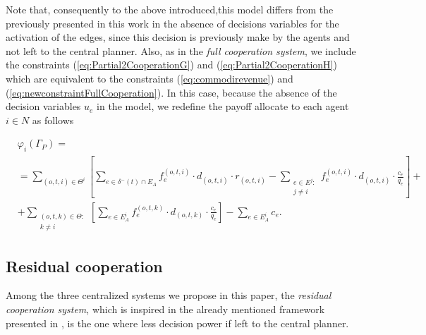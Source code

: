 \documentclass[review]{elsarticle}
\begin{document}
Note that, consequently to the above introduced,this model differs from the previously presented in this work in the absence of decisions variables for the activation of the edges, since this decision is previously make by the agents and not left to the central planner. Also, as in the \emph{full cooperation system}, we include the constraints (\ref{eq:Partial2CooperationG}) and (\ref{eq:Partial2CooperationH})
which are equivalent to the constraints (\ref{eq:commodirevenue}) and (\ref{eq:newconstraintFullCooperation}). In this case, because the absence of the decision variables $u_e$ in the model, we redefine the payoff allocate to each agent $i\in N$ as follows

\begin{equation}
    \begin{split}
    & \varphi_i(\Gamma_P) =\label{eq:PartialCooperationPayoff} \\
    & = \sum_{(o,t,i)\in \Theta^i} \left[ \sum_{e \in \delta^-(t)\cap E_A} f_e^{(o,t,i)} \cdot d_{(o,t,i)} \cdot r_{(o,t,i)} -  \sum_{\substack{e\in E^j \colon\\ j\not = i}} f_e^{(o,t,i)} \cdot d_{(o,t,i)} \cdot \frac{c_e}{q_e} \right] + \\
    & + \sum_{\substack{(o,t,k) \in \Theta  \colon \\ k \not = i}} \left[\sum_{e \in E_A^i} f_e^{(o,t,k)} \cdot d_{(o,t,k)} \cdot \frac{c_e}{q_e}\right] - \sum_{e \in E_A^i} c_e.
    \end{split}
\end{equation}

\subsection{Residual cooperation}

Among the three centralized systems we propose in this paper, the
\emph{residual cooperation system}, which is inspired in the already mentioned framework presented in \cite{ANUPINDI2001}, is the one where less decision power if left to the central planner.
\end{document}
